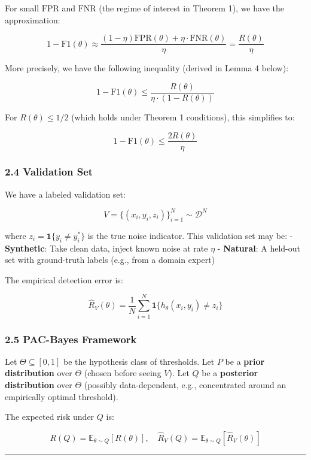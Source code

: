 \documentclass[
  12pt,
]{ctexart}
\begin{document}
For small \(\text{FPR}\) and \(\text{FNR}\) (the regime of interest in
Theorem 1), we have the approximation:

\[1 - \text{F1}(\theta) \approx \frac{(1-\eta)\text{FPR}(\theta) + \eta \cdot \text{FNR}(\theta)}{\eta} = \frac{R(\theta)}{\eta}\]

More precisely, we have the following inequality (derived in Lemma 4
below):

\[1 - \text{F1}(\theta) \leq \frac{R(\theta)}{\eta \cdot (1 - R(\theta))}\]

For \(R(\theta) \leq 1/2\) (which holds under Theorem 1 conditions),
this simplifies to:

\[1 - \text{F1}(\theta) \leq \frac{2R(\theta)}{\eta}\]

\subsubsection{2.4 Validation Set}\label{validation-set}

We have a labeled validation set:

\[V = \{(x_i, y_i, z_i)\}_{i=1}^N \sim \mathcal{D}^N\]

where \(z_i = \mathbf{1}\{y_i \neq y_i^*\}\) is the true noise
indicator. This validation set may be: - \textbf{Synthetic}: Take clean
data, inject known noise at rate \(\eta\) - \textbf{Natural}: A held-out
set with ground-truth labels (e.g., from a domain expert)

The empirical detection error is:

\[\hat{R}_V(\theta) = \frac{1}{N} \sum_{i=1}^N \mathbf{1}\{h_\theta(x_i, y_i) \neq z_i\}\]

\subsubsection{2.5 PAC-Bayes Framework}\label{pac-bayes-framework}

Let \(\Theta \subseteq [0,1]\) be the hypothesis class of thresholds.
Let \(P\) be a \textbf{prior distribution} over \(\Theta\) (chosen
before seeing \(V\)). Let \(Q\) be a \textbf{posterior distribution}
over \(\Theta\) (possibly data-dependent, e.g., concentrated around an
empirically optimal threshold).

The expected risk under \(Q\) is:

\[R(Q) = \mathbb{E}_{\theta \sim Q}[R(\theta)], \quad
\hat{R}_V(Q) = \mathbb{E}_{\theta \sim Q}[\hat{R}_V(\theta)]\]

\begin{center}\rule{0.5\linewidth}{0.5pt}\end{center}
\end{document}
